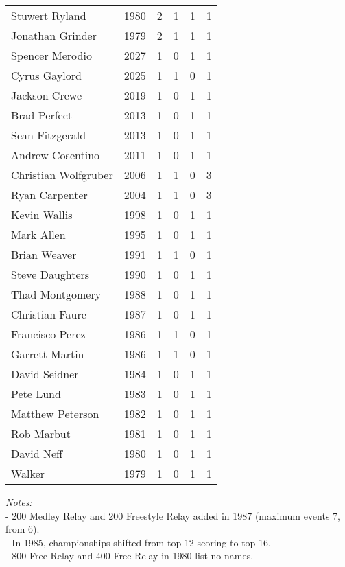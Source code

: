 \begin{longtable}{lccccc}
    Stuwert Ryland & 1980 & 2 & 1 & 1 & 1 \\
    Jonathan Grinder & 1979 & 2 & 1 & 1 & 1 \\
    Spencer Merodio & 2027 & 1 & 0 & 1 & 1 \\
    Cyrus Gaylord & 2025 & 1 & 1 & 0 & 1 \\
    Jackson Crewe & 2019 & 1 & 0 & 1 & 1 \\
    Brad Perfect & 2013 & 1 & 0 & 1 & 1 \\
    Sean Fitzgerald & 2013 & 1 & 0 & 1 & 1 \\
    Andrew Cosentino & 2011 & 1 & 0 & 1 & 1 \\
    Christian Wolfgruber & 2006 & 1 & 1 & 0 & 3 \\
    Ryan Carpenter & 2004 & 1 & 1 & 0 & 3 \\
    Kevin Wallis & 1998 & 1 & 0 & 1 & 1 \\
    Mark Allen & 1995 & 1 & 0 & 1 & 1 \\
    Brian Weaver & 1991 & 1 & 1 & 0 & 1 \\
    Steve Daughters & 1990 & 1 & 0 & 1 & 1 \\
    Thad Montgomery & 1988 & 1 & 0 & 1 & 1 \\
    Christian Faure & 1987 & 1 & 0 & 1 & 1 \\
    Francisco Perez & 1986 & 1 & 1 & 0 & 1 \\
    Garrett Martin & 1986 & 1 & 1 & 0 & 1 \\
    David Seidner & 1984 & 1 & 0 & 1 & 1 \\
    Pete Lund & 1983 & 1 & 0 & 1 & 1 \\
    Matthew Peterson & 1982 & 1 & 0 & 1 & 1 \\
    Rob Marbut & 1981 & 1 & 0 & 1 & 1 \\
    David Neff & 1980 & 1 & 0 & 1 & 1 \\
    Walker & 1979 & 1 & 0 & 1 & 1 \\
    \bottomrule
    \end{longtable}
    
    \noindent\textit{Notes:} \\
    - 200 Medley Relay and 200 Freestyle Relay added in 1987 (maximum events 7, from 6). \\
    - In 1985, championships shifted from top 12 scoring to top 16. \\
    - 800 Free Relay and 400 Free Relay in 1980 list no names.

